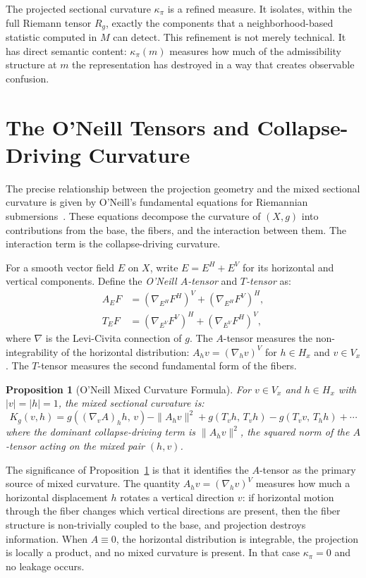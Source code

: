 \documentclass[12pt, oneside]{book}
\theoremstyle{plain-flyxion}
\newtheorem{proposition}[theorem]{Proposition}
\theoremstyle{definition-flyxion}
\newcommand{\kpi}{\kappa_{\pi}}
\begin{document}
The projected sectional curvature $\kpi$ is a refined measure. It isolates, within the
full Riemann tensor $R_g$, exactly the components that a neighborhood-based statistic
computed in $M$ can detect. This refinement is not merely technical. It has direct
semantic content: $\kpi(m)$ measures how much of the admissibility structure at $m$ the
representation has destroyed in a way that creates observable confusion.

\section{The O'Neill Tensors and Collapse-Driving Curvature}

The precise relationship between the projection geometry and the mixed sectional curvature
is given by O'Neill's fundamental equations for Riemannian submersions~\cite{oneill1966}.
These equations decompose the curvature of $(X,g)$ into contributions from the base,
the fibers, and the interaction between them. The interaction term is the collapse-driving
curvature.

For a smooth vector field $E$ on $X$, write $E = E^H + E^V$ for its horizontal and
vertical components. Define the \emph{O'Neill $A$-tensor} and \emph{$T$-tensor} as:
\begin{align}
A_E F &= (\nabla_{E^H} F^H)^V + (\nabla_{E^H} F^V)^H, \label{eq:A-tensor}\\
T_E F &= (\nabla_{E^V} F^V)^H + (\nabla_{E^V} F^H)^V, \label{eq:T-tensor}
\end{align}
where $\nabla$ is the Levi-Civita connection of $g$. The $A$-tensor measures the
non-integrability of the horizontal distribution: $A_h v = (\nabla_h v)^V$ for
$h\in H_x$ and $v\in V_x$. The $T$-tensor measures the second fundamental form of the
fibers.

\begin{proposition}[O'Neill Mixed Curvature Formula]\label{prop:oneill}
For $v\in V_x$ and $h\in H_x$ with $|v|=|h|=1$, the mixed sectional curvature is:
\begin{equation}\label{eq:oneill-mixed}
K_g(v, h) = g\!\left((\nabla_v A)_h h,\, v\right)
- \|A_h v\|^2
+ g\!\left(T_v h,\, T_v h\right) - g\!\left(T_v v,\, T_h h\right) + \cdots
\end{equation}
where the dominant collapse-driving term is $\|A_h v\|^2$, the squared norm of the
$A$-tensor acting on the mixed pair $(h, v)$.
\end{proposition}

The significance of Proposition~\ref{prop:oneill} is that it identifies the $A$-tensor
as the primary source of mixed curvature. The quantity $A_h v = (\nabla_h v)^V$ measures
how much a horizontal displacement $h$ rotates a vertical direction $v$: if horizontal
motion through the fiber changes which vertical directions are present, then the fiber
structure is non-trivially coupled to the base, and projection destroys information. When
$A \equiv 0$, the horizontal distribution is integrable, the projection is locally a
product, and no mixed curvature is present. In that case $\kpi = 0$ and no leakage
occurs.
\end{document}
